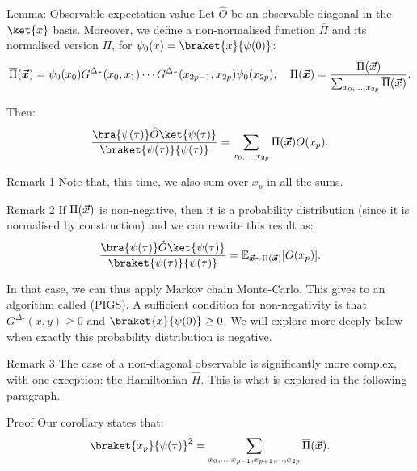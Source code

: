 \documentclass[a4paper]{article}
\begin{document}
\begin{parag}{Lemma: Observable expectation value}
    Let $\hat{O}$ be an observable diagonal in the $\ket{x}$ basis. Moreover, we define a non-normalised function $\bar{\Pi}$ and its normalised version $\Pi$, for $\psi_0\left(x\right) = \braket{x}{\psi\left(0\right)}$:
    \[\bar{\Pi}\left(\bvec{x}\right) = \psi_0\left(x_0\right) G^{\Delta_{\tau}}\left(x_0, x_1\right) \cdots G^{\Delta_{\tau}}\left(x_{2p-1}, x_{2p}\right) \psi_0\left(x_{2p}\right), \mathspace \Pi\left(\bvec{x}\right) = \frac{\bar{\Pi}\left(\bvec{x}\right)}{\sum_{x_0, \ldots, x_{2p}} \bar{\Pi}\left(\bvec{x}\right)}.\]

    Then: 
    \[\frac{\bra{\psi\left(\tau\right)} \hat{O} \ket{\psi\left(\tau\right)}}{\braket{\psi\left(\tau\right)}{\psi\left(\tau\right)}} = \sum_{x_0, \ldots, x_{2p}} \Pi\left(\bvec{x}\right) O\left(x_p\right).\]

    \begin{subparag}{Remark 1}
        Note that, this time, we also sum over $x_p$ in all the sums.
    \end{subparag}

    \begin{subparag}{Remark 2}
        If $\Pi\left(\bvec{x}\right)$ is non-negative, then it is a probability distribution (since it is normalised by construction) and we can rewrite this result as: 
        \[\frac{\bra{\psi\left(\tau\right)} \hat{O} \ket{\psi\left(\tau\right)}}{\braket{\psi\left(\tau\right)}{\psi\left(\tau\right)}} = \exval_{\bvec{x} \followsdistr \Pi\left(\bvec{x}\right)}\left[O\left(x_p\right)\right].\]
        
        In that case, we can thus apply Markov chain Monte-Carlo. This gives to an algorithm called  (PIGS). A sufficient condition for non-negativity is that $G^{\Delta_{\tau}}\left(x, y\right) \geq 0$ and $\braket{x}{\psi\left(0\right)} \geq 0$. We will explore more deeply below when exactly this probability distribution is negative.
    \end{subparag}

    \begin{subparag}{Remark 3}
        The case of a non-diagonal observable is significantly more complex, with one exception: the Hamiltonian $\hat{H}$. This is what is explored in the following paragraph.
    \end{subparag}

    \begin{subparag}{Proof}
        Our corollary states that: 
        \[\braket{x_p}{\psi\left(\tau\right)}^2 = \sum_{x_0, \ldots, x_{p-1}, x_{p+1}, \ldots, x_{2p}} \bar{\Pi}\left(\bvec{x}\right).\]
        

\end{subparag}
\end{parag}
\end{document}
